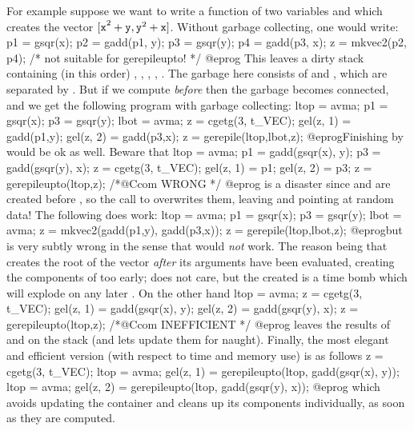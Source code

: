 For example suppose we want to write a function of two  variables
 and  which creates the vector ${\tt [x}^2+{\tt y},
{\tt y}^2+{\tt x]}$. Without garbage collecting, one would write:
%
\bprog
  p1 = gsqr(x); p2 = gadd(p1, y);
  p3 = gsqr(y); p4 = gadd(p3, x);
  z = mkvec2(p2, p4);  /* not suitable for gerepileupto! */
@eprog\noindent
This leaves a dirty stack containing (in this order) , ,
, , . The garbage here consists of  and
, which are separated by . But if we compute 
\emph{before}  then the garbage becomes connected, and we get the
following program with garbage collecting:
%
\bprog
  ltop = avma; p1 = gsqr(x); p3 = gsqr(y);
  lbot = avma; z = cgetg(3, t_VEC);
  gel(z, 1) = gadd(p1,y);
  gel(z, 2) = gadd(p3,x); z = gerepile(ltop,lbot,z);
@eprog\noindent Finishing by  would be ok as
well. Beware that
\bprog
  ltop = avma; p1 = gadd(gsqr(x), y); p3 = gadd(gsqr(y), x);
  z = cgetg(3, t_VEC);
  gel(z, 1) = p1;
  gel(z, 2) = p3; z = gerepileupto(ltop,z); /*@Ccom WRONG */
@eprog\noindent
is a disaster since  and  are created before
, so the call to  overwrites them, leaving
 and  pointing at random data! The following
does work:
\bprog
  ltop = avma; p1 = gsqr(x); p3 = gsqr(y);
  lbot = avma; z = mkvec2(gadd(p1,y), gadd(p3,x));
  z = gerepile(ltop,lbot,z);
@eprog\noindent but is very subtly wrong in the sense that
 would \emph{not} work. The reason being
that  creates the root  of the vector \emph{after}
its arguments have been evaluated, creating the components of 
too early;  does not care, but the created  is a time
bomb which will explode on any later .
On the other hand
\bprog
  ltop = avma; z = cgetg(3, t_VEC);
  gel(z, 1) = gadd(gsqr(x), y);
  gel(z, 2) = gadd(gsqr(y), x); z = gerepileupto(ltop,z); /*@Ccom INEFFICIENT */
@eprog\noindent
leaves the results of  and  on the stack (and
lets  update them for naught). Finally, the most elegant
and efficient version (with respect to time and memory use) is as follows
\bprog
  z = cgetg(3, t_VEC);
  ltop = avma; gel(z, 1) = gerepileupto(ltop, gadd(gsqr(x), y));
  ltop = avma; gel(z, 2) = gerepileupto(ltop, gadd(gsqr(y), x));
@eprog\noindent
which avoids updating the container  and cleans up its components
individually, as soon as they are computed.

